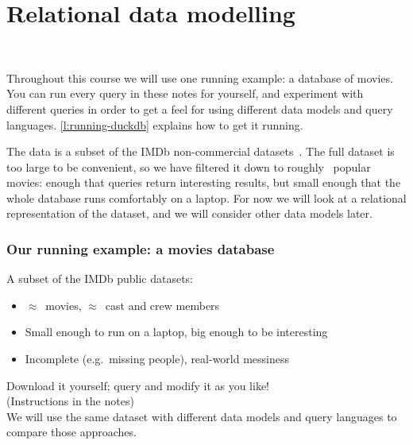 \section{Relational data modelling}\label{sec:relational}

\begin{frame}
    \begin{center}
        {\Large{\color{darkblue}{Relational data modelling}}} \\[2em]
        \mydetails
    \end{center}
\end{frame}

Throughout this course we will use one running example: a database of movies.
You can run every query in these notes for yourself, and experiment with different queries in order to get a feel for using different data models and query languages.
\autoref{l:running-duckdb} explains how to get it running.

The data is a subset of the IMDb non-commercial datasets~\citep{IMDb:2025}.
The full dataset is too large to be convenient, so we have filtered it down to roughly \dbapproxmovies\ popular movies: enough that queries return interesting results, but small enough that the whole database runs comfortably on a laptop.
For now we will look at a relational representation of the dataset, and we will consider other data models later.

\begin{frame}
    \label{s:moviedb-intro}
    \frametitle{Our running example: a movies database}
    A subset of the IMDb public datasets:
    \begin{itemize}
        \item $\approx$\dbapproxmovies\ movies, $\approx$\dbapproxpeople\ cast and crew members
        \item Small enough to run on a laptop, big enough to be interesting
        \item Incomplete (e.g.\ missing people), real-world messiness\\[1em]\pause
    \end{itemize}
    Download it yourself; query and modify it as you like!\\
    (Instructions in the notes)\\[1em]
    We will use the same dataset with different data models and query languages to compare those approaches.
\end{frame}
\label{l:moviedb-intro}

